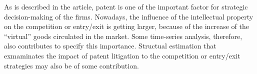 \documentclass{jsarticle}[12pt]
\begin{document}
  As is described in the article, patent is one of the important factor for strategic decision-making of the firms. Nowadays, the influence of the intellectual property on the competition or entry/exit is getting larger, because of the increase of the ``virtual'' goods circulated in the market. Some time-series analysis, therefore, also contributes to specify this importance. Structual estimation that exmaminates the impact of patent litigation to the competition or entry/exit strategies may also be of some contribution.
\end{document}
